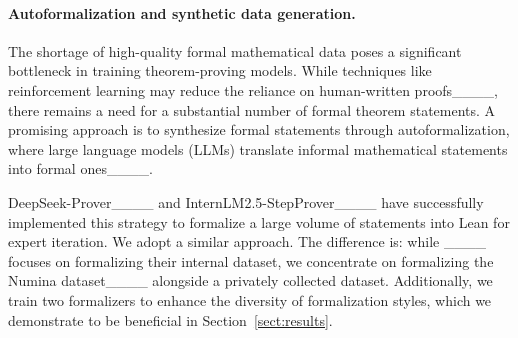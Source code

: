 \paragraph{Autoformalization and synthetic data generation.} 
The shortage of high-quality formal mathematical data poses a significant bottleneck in training theorem-proving models. While techniques like reinforcement learning may reduce the reliance on human-written proofs____, there remains a need for a substantial number of formal theorem statements. A promising approach is to synthesize formal statements through autoformalization, where large language models (LLMs) translate informal mathematical statements into formal ones____. 

DeepSeek-Prover____ and InternLM2.5-StepProver____ have successfully implemented this strategy to formalize a large volume of statements into Lean for expert iteration. We adopt a similar approach. The difference is: while ____ focuses on formalizing their internal dataset, we concentrate on formalizing the Numina dataset____ alongside a privately collected dataset. Additionally, we train two formalizers to enhance the diversity of formalization styles, which we demonstrate to be beneficial in Section~\ref{sect:results}. %



